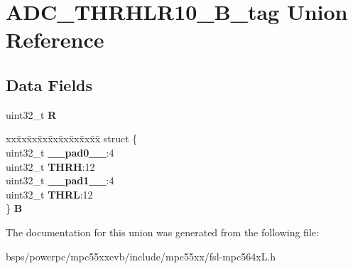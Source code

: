 \hypertarget{unionADC__THRHLR10__32B__tag}{}\section{A\+D\+C\+\_\+\+T\+H\+R\+H\+L\+R10\+\_\+B\+\_\+tag Union Reference}
\label{unionADC__THRHLR10__32B__tag}
\subsection*{Data Fields}
\begin{DoxyCompactItemize}
\item 
\mbox{\label{unionADC__THRHLR10__32B__tag_a3b32a9c7198d797142bb0e8616b354af}} 
uint32\+\_\+t {\bfseries R}
\item 
\mbox{\label{unionADC__THRHLR10__32B__tag_af96f11e9466dc107718f1a66c949460f}} 
\begin{tabbing}
xx\=xx\=xx\=xx\=xx\=xx\=xx\=xx\=xx\=\kill
struct \{\\
\>uint32\_t {\bfseries \_\_pad0\_\_}:4\\
\>uint32\_t {\bfseries THRH}:12\\
\>uint32\_t {\bfseries \_\_pad1\_\_}:4\\
\>uint32\_t {\bfseries THRL}:12\\
\} {\bfseries B}\\

\end{tabbing}\end{DoxyCompactItemize}


The documentation for this union was generated from the following file\+:\begin{DoxyCompactItemize}
\item 
bsps/powerpc/mpc55xxevb/include/mpc55xx/fsl-\/mpc564x\+L.\+h\end{DoxyCompactItemize}
